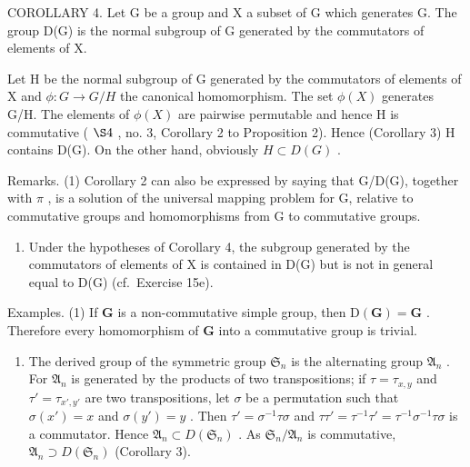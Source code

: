 COROLLARY 4. Let G be a group and X a subset of G which generates G. The group D(G) is the normal subgroup of G generated by the commutators of elements of X.

Let H be the normal subgroup of G generated by the commutators of elements of X and \(\phi: G \to G/H\) the canonical homomorphism. The set \(\phi(X)\) generates G/H. The elements of \(\phi(X)\) are pairwise permutable and hence H is commutative ( \(\S 4\) , no. 3, Corollary 2 to Proposition 2). Hence (Corollary 3) H contains D(G). On the other hand, obviously \(H \subset D(G)\) .

Remarks. (1) Corollary 2 can also be expressed by saying that G/D(G), together with \(\pi\) , is a solution of the universal mapping problem for G, relative to commutative groups and homomorphisms from G to commutative groups.

\begin{enumerate}
\def\labelenumi{(\arabic{enumi})}
\setcounter{enumi}{1}
\tightlist
\item
  Under the hypotheses of Corollary 4, the subgroup generated by the commutators of elements of X is contained in D(G) but is not in general equal to D(G) (cf.~Exercise 15e).
\end{enumerate}

Examples. (1) If \(\mathbf{G}\) is a non-commutative simple group, then \(\mathrm{D}(\mathbf{G}) = \mathbf{G}\) . Therefore every homomorphism of \(\mathbf{G}\) into a commutative group is trivial.

\begin{enumerate}
\def\labelenumi{(\arabic{enumi})}
\setcounter{enumi}{1}
\tightlist
\item
  The derived group of the symmetric group \(\mathfrak{S}_n\) is the alternating group \(\mathfrak{A}_n\) . For \(\mathfrak{A}_n\) is generated by the products of two transpositions; if \(\tau = \tau_{x,y}\) and \(\tau' = \tau_{x',y'}\) are two transpositions, let \(\sigma\) be a permutation such that \(\sigma(x') = x\) and \(\sigma(y') = y\) . Then \(\tau' = \sigma^{-1}\tau\sigma\) and \(\tau\tau' = \tau^{-1}\tau' = \tau^{-1}\sigma^{-1}\tau\sigma\) is a commutator. Hence \(\mathfrak{A}_n \subset D(\mathfrak{S}_n)\) . As \(\mathfrak{S}_n / \mathfrak{A}_n\) is commutative, \(\mathfrak{A}_n \supset D(\mathfrak{S}_n)\) (Corollary 3).
\end{enumerate}

